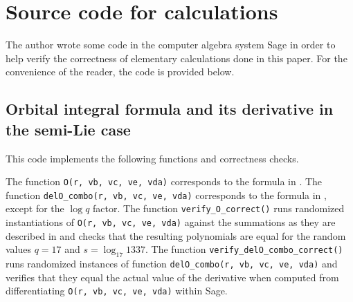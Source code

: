 \chapter{Source code for calculations}
The author wrote some code in the computer algebra system Sage
in order to help verify the correctness of elementary calculations done in this paper.
For the convenience of the reader, the code is provided below.

\section{Orbital integral formula and its derivative in the semi-Lie case}
This code implements the following functions and correctness checks.
\begin{itemize}
  \ii The function \texttt{O(r, vb, vc, ve, vda)}
  corresponds to the formula in .
  \ii The function \texttt{delO\_combo(r, vb, vc, ve, vda)}
  corresponds to the formula in ,
  except for the $\log q$ factor.
  \ii The function \texttt{verify\_O\_correct()}
  runs randomized instantiations of \texttt{O(r, vb, vc, ve, vda)}
  against the summations as they are described in 
  and checks that the resulting polynomials are equal for the random values
  $q = 17$ and $s = \log_{17} 1337$.
  \ii The function \texttt{verify\_delO\_combo\_correct()}
  runs randomized instances of
  function \texttt{delO\_combo(r, vb, vc, ve, vda)}
  and verifies that they equal the actual value of the derivative
  when computed from differentiating \texttt{O(r, vb, vc, ve, vda)} within Sage.
\end{itemize}


